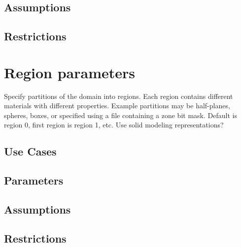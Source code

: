 \documentclass{book}
\begin{document}
\subsection{Assumptions}
\subsection{Restrictions}


\section{Region parameters} \label{s:region}

Specify partitions of the domain into regions.  Each region contains
different materials with different properties.  Example partitions may
be half-planes, spheres, boxes, or specified using a file containing a
zone bit mask.  Default is region 0, first region is region 1, etc.
Use solid modeling representations?

\subsection{Use Cases}
\subsection{Parameters}
\subsection{Assumptions}
\subsection{Restrictions}
\end{document}

